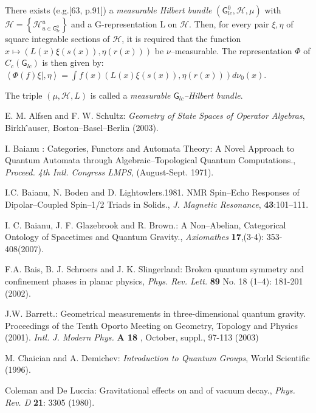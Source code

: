 \documentclass[12pt]{article}
\theoremstyle{plain}
\theoremstyle{definition}
\numberwithin{equation}{section}
\renewcommand{\H}{\mathcal H}
\newcommand{\grp}{{\mathsf{G}}}
\newcommand{\<}{{\langle}}
\begin{document}
There exists (e.g.[63, p.91]) a \textit{measurable Hilbert bundle}
$(\grp_{lc}^0, \H, \mu)$ with $\H  = \left\{ \H^u_{u \in
\grp_{lc}^0} \right\}$ and a G-representation L on $\H$.  Then,
for every pair $\xi, \eta$ of square integrable sections of $\H$,
it is required that the function $x \mapsto (L(x)\xi (s(x)), \eta
(r(x)))$ be $\nu$--measurable. The representation $\Phi$ of
$C_c(\grp_{lc})$ is then given by:\\ $\left\langle \Phi(f) \xi
\vert,\eta \right\rangle = \int f(x)(L(x) \xi (s(x)), \eta (r(x)))
d \nu_0(x)$.


The triple $(\mu, \H, L)$ is called a \textit{measurable
$\grp_{lc}$--Hilbert bundle}.



\begin{thebibliography}{9}

E. M. Alfsen and F. W. Schultz: \emph{Geometry of State Spaces of
Operator Algebras}, Birkh\''auser, Boston--Basel--Berlin (2003).

I. Baianu : Categories, Functors and Automata Theory: A Novel Approach to Quantum Automata through Algebraic--Topological Quantum Computations., \emph{Proceed. 4th Intl. Congress LMPS}, (August-Sept. 1971).

I.C. Baianu, N. Boden and D. Lightowlers.1981. NMR Spin--Echo Responses of Dipolar--Coupled Spin--1/2 Triads in Solids., \emph{J. Magnetic Resonance}, \textbf{43}:101--111.

I. C. Baianu, J. F. Glazebrook and R. Brown.: A Non--Abelian, Categorical Ontology of Spacetimes and Quantum Gravity., \emph{Axiomathes} \textbf{17},(3-4): 353-408(2007).

F.A. Bais, B. J. Schroers and J. K. Slingerland: Broken quantum symmetry and confinement phases in planar physics, \emph{Phys. Rev. Lett.} \textbf{89} No. 18 (1--4): 181-201 (2002).

J.W. Barrett.: Geometrical measurements in three-dimensional quantum gravity.
Proceedings of the Tenth Oporto Meeting on Geometry, Topology and Physics (2001).
\textit{Intl. J. Modern Phys.} \textbf{A 18} , October, suppl., 97-113 (2003)


M. Chaician and A. Demichev: \emph{Introduction to Quantum Groups}, World Scientific (1996).

Coleman and De Luccia: Gravitational effects on and of vacuum decay., \emph{Phys. Rev. D} \textbf{21}: 3305 (1980).


\end{thebibliography}
\end{document}
